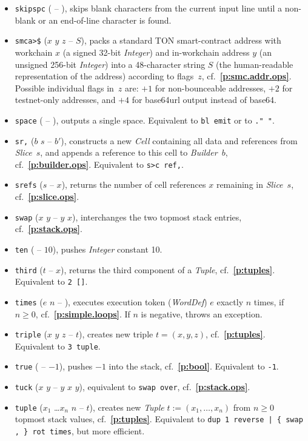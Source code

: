\documentclass[12pt,oneside]{article}
\def\refpoint#1{{\rm\textbf{\ref{#1}}}}
\let\ptref=\refpoint
\begin{document}
\begin{itemize}
\item {\tt skipspc} ( -- ), skips blank characters from the current input line until a non-blank or an end-of-line character is found.
\item {\tt smca>\$} ($x$ $y$ $z$ -- $S$), packs a standard TON smart-contract address with workchain $x$ (a signed 32-bit {\em Integer\/}) and in-workchain address $y$ (an unsigned 256-bit {\em Integer\/}) into a 48-character string $S$ (the human-readable representation of the address) according to flags~$z$, cf.~\ptref{p:smc.addr.ops}. Possible individual flags in~$z$ are: $+1$ for non-bounceable addresses, $+2$ for testnet-only addresses, and $+4$ for base64url output instead of base64.
\item {\tt space} ( -- ), outputs a single space. Equivalent to {\tt bl emit} or to {\tt ." "}.
\item {\tt sr,} ($b$ $s$ -- $b'$), constructs a new {\em Cell\/} containing all data and references from {\em Slice\/}~$s$, and appends a reference to this cell to {\em Builder}~$b$, cf.~\ptref{p:builder.ops}. Equivalent to {\tt s>c ref,}.
\item {\tt srefs} ($s$ -- $x$), returns the number of cell references $x$ remaining in {\em Slice}~$s$, cf.~\ptref{p:slice.ops}.
\item {\tt swap} ($x$ $y$ -- $y$ $x$), interchanges the two topmost stack entries, cf.~\ptref{p:stack.ops}.
\item {\tt ten} ( -- $10$), pushes {\em Integer\/} constant 10.
\item {\tt third} ($t$ -- $x$), returns the third component of a {\em Tuple}, cf.~\ptref{p:tuples}. Equivalent to {\tt 2 []}.
\item {\tt times} ($e$ $n$ -- ), executes execution token ({\em WordDef\/}) $e$ exactly $n$ times, if $n\geq0$, cf.~\ptref{p:simple.loops}. If $n$ is negative, throws an exception.
\item {\tt triple} ($x$ $y$ $z$ -- $t$), creates new triple $t=(x,y,z)$, cf.~\ptref{p:tuples}. Equivalent to {\tt 3 tuple}.
\item {\tt true} ( -- $-1$), pushes $-1$ into the stack, cf.~\ptref{p:bool}. Equivalent to {\tt -1}.
\item {\tt tuck} ($x$ $y$ -- $y$ $x$ $y$), equivalent to {\tt swap over}, cf.~\ptref{p:stack.ops}.
\item {\tt tuple} ($x_1$ \dots $x_n$ $n$ -- $t$), creates new {\em Tuple\/} $t:=(x_1,\ldots,x_n)$ from $n\geq0$ topmost stack values, cf.~\ptref{p:tuples}. Equivalent to {\tt dup 1 reverse | \{ swap , \} rot times}, but more efficient.

\end{itemize}
\end{document}
